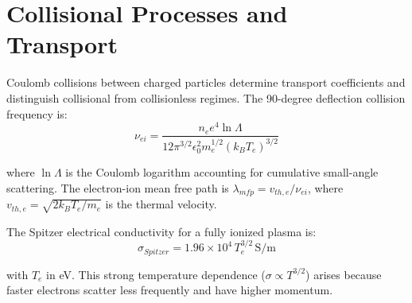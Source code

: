 \documentclass[11pt,a4paper]{article}
\begin{document}
\section{Collisional Processes and Transport}

Coulomb collisions between charged particles determine transport coefficients and distinguish collisional from collisionless regimes. The 90-degree deflection collision frequency is:
\begin{equation}
\nu_{ei} = \frac{n_e e^4 \ln\Lambda}{12\pi^{3/2} \epsilon_0^2 m_e^{1/2} (k_B T_e)^{3/2}}
\end{equation}

where $\ln\Lambda$ is the Coulomb logarithm accounting for cumulative small-angle scattering. The electron-ion mean free path is $\lambda_{mfp} = v_{th,e} / \nu_{ei}$, where $v_{th,e} = \sqrt{2k_B T_e / m_e}$ is the thermal velocity.

The Spitzer electrical conductivity for a fully ionized plasma is:
\begin{equation}
\sigma_{Spitzer} = 1.96 \times 10^4 \, T_e^{3/2} \, \text{S/m}
\end{equation}

with $T_e$ in eV. This strong temperature dependence ($\sigma \propto T^{3/2}$) arises because faster electrons scatter less frequently and have higher momentum.
\end{document}
